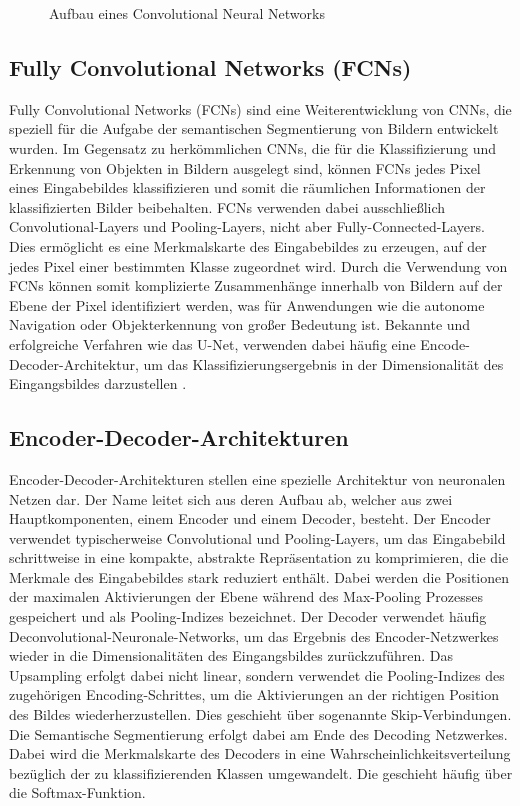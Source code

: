 \begin{figure}
    \centering
    
    \caption{Aufbau eines Convolutional Neural Networks}
    \label{fig:meinbild}
\end{figure}

\subsection{Fully Convolutional Networks (FCNs)}
Fully Convolutional Networks (FCNs) sind eine Weiterentwicklung von CNNs, die
speziell für die Aufgabe der semantischen Segmentierung von Bildern entwickelt
wurden. Im Gegensatz zu herkömmlichen CNNs, die für die Klassifizierung und
Erkennung von Objekten in Bildern ausgelegt sind, können FCNs jedes Pixel eines
Eingabebildes klassifizieren und somit die räumlichen Informationen der
klassifizierten Bilder beibehalten. FCNs verwenden dabei ausschließlich
Convolutional-Layers und Pooling-Layers, nicht aber Fully-Connected-Layers.
Dies ermöglicht es eine Merkmalskarte des Eingabebildes zu erzeugen, auf der
jedes Pixel einer bestimmten Klasse zugeordnet wird. Durch die Verwendung von
FCNs können somit komplizierte Zusammenhänge innerhalb von Bildern auf der
Ebene der Pixel identifiziert werden, was für Anwendungen wie die autonome
Navigation oder Objekterkennung von großer Bedeutung ist. \cite{7803544}
Bekannte und erfolgreiche Verfahren wie das U-Net, verwenden dabei häufig eine
Encode-Decoder-Architektur, um das Klassifizierungsergebnis in der
Dimensionalität des Eingangsbildes darzustellen \cite{8309343}.

\subsection{Encoder-Decoder-Architekturen}
Encoder-Decoder-Architekturen stellen eine spezielle Architektur von neuronalen
Netzen dar. Der Name leitet sich aus deren Aufbau ab, welcher aus zwei
Hauptkomponenten, einem Encoder und einem Decoder, besteht. Der Encoder
verwendet typischerweise Convolutional und Pooling-Layers, um das Eingabebild
schrittweise in eine kompakte, abstrakte Repräsentation zu komprimieren, die
die Merkmale des Eingabebildes stark reduziert enthält. Dabei werden die
Positionen der maximalen Aktivierungen der Ebene während des Max-Pooling
Prozesses gespeichert und als Pooling-Indizes bezeichnet. Der Decoder verwendet
häufig Deconvolutional-Neuronale-Networks, um das Ergebnis des
Encoder-Netzwerkes wieder in die Dimensionalitäten des Eingangsbildes
zurückzuführen. Das Upsampling erfolgt dabei nicht linear, sondern verwendet
die Pooling-Indizes des zugehörigen Encoding-Schrittes, um die Aktivierungen an
der richtigen Position des Bildes wiederherzustellen. Dies geschieht über
sogenannte Skip-Verbindungen. Die Semantische Segmentierung erfolgt dabei am
Ende des Decoding Netzwerkes. Dabei wird die Merkmalskarte des Decoders in eine
Wahrscheinlichkeitsverteilung bezüglich der zu klassifizierenden Klassen
umgewandelt. Die geschieht häufig über die Softmax-Funktion. \cite{7803544}

